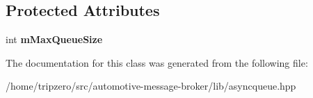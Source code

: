 \subsection*{Protected Attributes}
\begin{DoxyCompactItemize}
\item 
\hypertarget{classamb_1_1AsyncQueueWatcher_a2dd2243a734ce4cd960f689e5cd9988c}{int {\bfseries m\-Max\-Queue\-Size}}\label{classamb_1_1AsyncQueueWatcher_a2dd2243a734ce4cd960f689e5cd9988c}

\end{DoxyCompactItemize}


The documentation for this class was generated from the following file\-:\begin{DoxyCompactItemize}
\item 
/home/tripzero/src/automotive-\/message-\/broker/lib/asyncqueue.\-hpp\end{DoxyCompactItemize}
